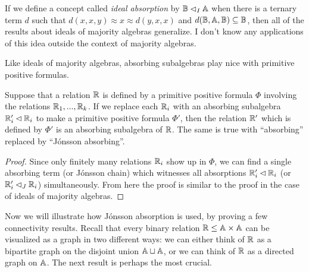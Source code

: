 \documentclass[letterpaper,11pt]{article}
\begin{document}
\begin{rem} If we define a concept called \emph{ideal absorption} by $\mathbb{B} \lhd_I \mathbb{A}$ when there is a ternary term $d$ such that $d(x,x,y) \approx x \approx d(y,x,x)$ and $d(\mathbb{B},\mathbb{A},\mathbb{B}) \subseteq \mathbb{B}$, then all of the results about ideals of majority algebras generalize. I don't know any applications of this idea outside the context of majority algebras.%
\end{rem}

Like ideals of majority algebras, absorbing subalgebras play nice with primitive positive formulas.

\begin{prop} Suppose that a relation $\mathbb{R}$ is defined by a primitive positive formula $\Phi$ involving the relations $\mathbb{R}_1, ..., \mathbb{R}_k$. If we replace each $\mathbb{R}_i$ with an absorbing subalgebra $\mathbb{R}_i' \lhd \mathbb{R}_i$ to make a primitive positive formula $\Phi'$, then the relation $\mathbb{R}'$ which is defined by $\Phi'$ is an absorbing subalgebra of $\mathbb{R}$. The same is true with ``absorbing'' replaced by ``J\'onsson absorbing''.
\end{prop}
\begin{proof} Since only finitely many relations $\mathbb{R}_i$ show up in $\Phi$, we can find a single absorbing term (or J\'onsson chain) which witnesses all absorptions $\mathbb{R}_i' \lhd \mathbb{R}_i$ (or $\mathbb{R}_i' \lhd_J \mathbb{R}_i$) simultaneously. From here the proof is similar to the proof in the case of ideals of majority algebras.
\end{proof}

Now we will illustrate how J\'onsson absorption is used, by proving a few connectivity results. Recall that every binary relation $\mathbb{R} \le \mathbb{A}\times \mathbb{A}$ can be visualized as a graph in two different ways: we can either think of $\mathbb{R}$ as a bipartite graph on the disjoint union $\mathbb{A} \sqcup \mathbb{A}$, or we can think of $\mathbb{R}$ as a directed graph on $\mathbb{A}$. The next result is perhaps the most crucial.
\end{document}
